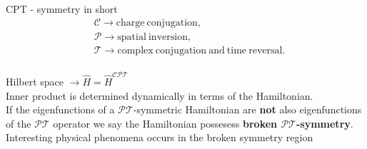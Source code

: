 \documentclass[10pt]{beamer}
\begin{document}
\begin{frame}{CPT - symmetry in short}
    \vspace{-1cm}
    \begin{align*}
        & \mathcal{C} \rightarrow \mathrm{charge\:conjugation},\\
        & \mathcal{P} \rightarrow \mathrm{spatial\:inversion},\\
        & \mathcal{T} \rightarrow \mathrm{complex\:conjugation\:and\:time\:reversal}.
    \end{align*}\\
    \vspace{-0.4cm}
    Hilbert space $\rightarrow \hat{H} = \hat{H}^{\mathcal{CPT}}$ \\
    \vspace{0.5cm}
    \pause
    Inner product is determined dynamically in terms of the Hamiltonian.\\
    \pause
    \vspace{0.5cm}
    If the eigenfunctions of a $\mathcal{PT}$-symmetric Hamiltonian are \textbf{not} also eigenfunctions of the $\mathcal{PT}$ operator we say the Hamiltonian possesess \textbf{broken $\mathcal{PT}$-symmetry}.\\
    \pause
    \vspace{0.5cm}
    Interesting physical phenomena occurs in the broken symmetry region
\end{frame}
\end{document}
